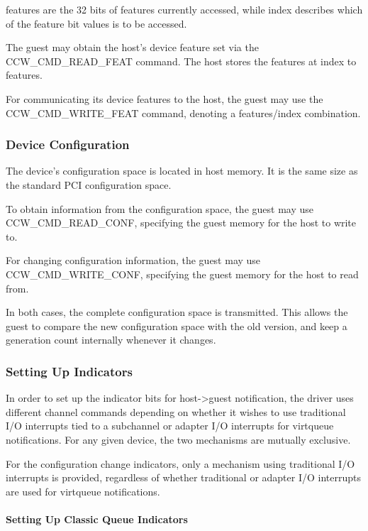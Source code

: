 features are the 32 bits of features currently accessed, while
index describes which of the feature bit values is to be
accessed.

The guest may obtain the host's device feature set via the
CCW_CMD_READ_FEAT command. The host stores the features at index
to features.

For communicating its device features to the host, the guest may
use the CCW_CMD_WRITE_FEAT command, denoting a features/index
combination.

\subsubsection{Device Configuration}\label{sec:Virtio Transport Options / Virtio over channel I/O / Device Initialization / Device Configuration}

The device's configuration space is located in host memory. It is
the same size as the standard PCI configuration space.

To obtain information from the configuration space, the guest may
use CCW_CMD_READ_CONF, specifying the guest memory for the host
to write to.

For changing configuration information, the guest may use
CCW_CMD_WRITE_CONF, specifying the guest memory for the host to
read from.

In both cases, the complete configuration space is transmitted.  This
allows the guest to compare the new configuration space with the old
version, and keep a generation count internally whenever it changes.

\subsubsection{Setting Up Indicators}\label{sec:Virtio Transport Options / Virtio over channel I/O / Device Initialization / Setting Up Indicators}

In order to set up the indicator bits for host->guest notification,
the driver uses different channel commands depending on whether it
wishes to use traditional I/O interrupts tied to a subchannel or
adapter I/O interrupts for virtqueue notifications. For any given
device, the two mechanisms are mutually exclusive.

For the configuration change indicators, only a mechanism using
traditional I/O interrupts is provided, regardless of whether
traditional or adapter I/O interrupts are used for virtqueue
notifications.

\paragraph{Setting Up Classic Queue Indicators}\label{sec:Virtio Transport Options / Virtio over channel I/O / Device Initialization / Setting Up Indicators / Setting Up Classic Queue Indicators}

